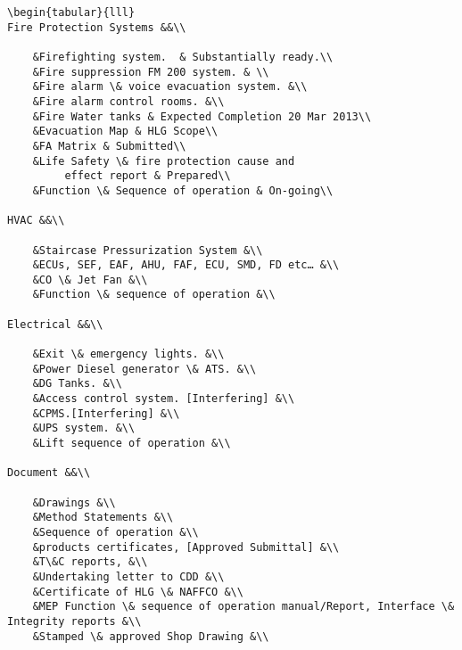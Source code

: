\begin{verbatim}
\begin{tabular}{lll}
Fire Protection Systems &&\\

    &Firefighting system.  & Substantially ready.\\
    &Fire suppression FM 200 system. & \\
	&Fire alarm \& voice evacuation system. &\\
	&Fire alarm control rooms. &\\
	&Fire Water tanks & Expected Completion 20 Mar 2013\\
	&Evacuation Map & HLG Scope\\
	&FA Matrix & Submitted\\
	&Life Safety \& fire protection cause and 
         effect report & Prepared\\
	&Function \& Sequence of operation & On-going\\

HVAC &&\\

	&Staircase Pressurization System &\\
	&ECUs, SEF, EAF, AHU, FAF, ECU, SMD, FD etc… &\\
	&CO \& Jet Fan &\\
	&Function \& sequence of operation &\\

Electrical &&\\

	&Exit \& emergency lights. &\\
	&Power Diesel generator \& ATS. &\\
	&DG Tanks. &\\
	&Access control system. [Interfering] &\\
	&CPMS.[Interfering] &\\
	&UPS system. &\\
	&Lift sequence of operation &\\

Document &&\\

	&Drawings &\\
	&Method Statements &\\
	&Sequence of operation &\\
	&products certificates, [Approved Submittal] &\\
	&T\&C reports, &\\
	&Undertaking letter to CDD &\\
	&Certificate of HLG \& NAFFCO &\\
	&MEP Function \& sequence of operation manual/Report, Interface \& Integrity reports &\\
	&Stamped \& approved Shop Drawing &\\
\end{verbatim}



